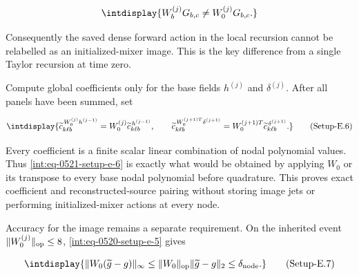 \begingroup\renewcommand{\theHequation}{intdisplay.1006}
\begin{equation*}
\intdisplay{
W_b^{(j)}G_{b,c}\ne W_0^{(j)}G_{b,c}.
}
\end{equation*}
\endgroup


Consequently the saved dense forward action in the local recursion cannot be relabelled as an initialized-mixer image. This is the key difference from a single Taylor recursion at time zero.



Compute global coefficients only for the base fields \(h^{(j)}\) and \(\delta^{(j)}\). After all panels have been summed, set


\label{int:eq-setup-e-6}
\begingroup\renewcommand{\theHequation}{intdisplay.1007}
\begin{equation}
\intdisplay{
\widetilde c_{k\ell b}^{\,W_0^{(j)}h^{(j-1)}}
       =W_0^{(j)}\widetilde c_{k\ell b}^{\,h^{(j-1)}},\qquad
\widetilde c_{k\ell b}^{\,W_0^{(j+1)T}\delta^{(j+1)}}
       =W_0^{(j+1)T}\widetilde c_{k\ell b}^{\,\delta^{(j+1)}}.
}
\tag{Setup-E.6}
\label{int:eq-0521-setup-e-6}
\end{equation}
\endgroup


Every coefficient is a finite scalar linear combination of nodal polynomial values. Thus \hyperref[int:eq-setup-e-6]{\eqref{int:eq-0521-setup-e-6}} is exactly what would be obtained by applying \(W_0\) or its transpose to every base nodal polynomial before quadrature. This proves exact coefficient and reconstructed-source pairing without storing image jets or performing initialized-mixer actions at every node.



Accuracy for the image remains a separate requirement. On the inherited event \(\|W_0^{(j)}\|_{\rm op}\le8\), \hyperref[int:eq-setup-e-5]{\eqref{int:eq-0520-setup-e-5}} gives


\label{int:eq-setup-e-7}
\begingroup\renewcommand{\theHequation}{intdisplay.1008}
\begin{equation}
\intdisplay{
\|W_0(\widetilde g-g)\|_\infty
 \le\|W_0\|_{\rm op}\|\widetilde g-g\|_2
 \le\delta_{\rm node}.
}
\tag{Setup-E.7}
\label{int:eq-0522-setup-e-7}
\end{equation}
\endgroup

